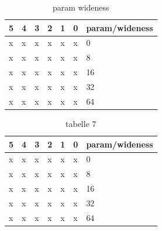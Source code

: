 \begin{table}[H]
\centering
\caption{param wideness}
\label{Integer overflow bug detection in CWE-190}
\begin{tabular}{|l|l|l|l|l|l|l|} \hline
\textbf{5}  & \textbf{4}     & \textbf{3}    &\textbf{2} & \textbf{1}  & \textbf{0} &\textbf{param/wideness}  \\ \hline 
x           &x               &x              &x          &x            &x           &0                         \\ \hline
x           &x               &x              &x          &x            &x           &8                         \\ \hline
x           &x               &x              &x          &x            &x           &16                         \\ \hline
x           &x               &x              &x          &x            &x           &32                         \\ \hline
x           &x               &x              &x          &x            &x           &64                         \\ \hline

\end{tabular}
\end{table}

\begin{table}[H]
\centering
\caption{tabelle 7}
\label{Integer overflow bug detection in CWE-190}
\begin{tabular}{|l|l|l|l|l|l|l|} \hline
\textbf{5}  & \textbf{4}     & \textbf{3}    &\textbf{2} & \textbf{1}  & \textbf{0} &\textbf{param/wideness}  \\ \hline 
x           &x               &x              &x          &x            &x           &0                         \\ \hline
x           &x               &x              &x          &x            &x           &8                         \\ \hline
x           &x               &x              &x          &x            &x           &16                         \\ \hline
x           &x               &x              &x          &x            &x           &32                         \\ \hline
x           &x               &x              &x          &x            &x           &64                         \\ \hline

\end{tabular}
\end{table}

